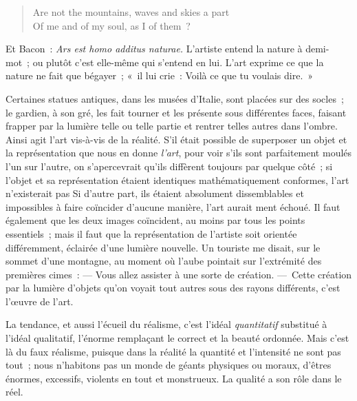 \documentclass[french,twoside]{book} %
\begin{document}
\begin{verse}
Are not the mountains, waves and skies a part\\
Of me and of my soul, as I of them ?\\
\end{verse}

\noindent Et Bacon : \emph{Ars est homo additus naturae.} L’artiste entend la nature à demi-mot ; ou plutôt c’est elle-même qui s’entend en lui. L’art exprime ce que la nature ne fait que bégayer ; « il lui crie : Voilà ce que tu voulais dire. »\par
Certaines statues antiques, dans les musées d’Italie, sont placées sur des socles ; le gardien, à son gré, les fait tourner et les présente sous différentes faces, faisant frapper par la lumière telle ou telle partie et rentrer telles autres dans l’ombre. Ainsi agit l’art vis-à-vis de la réalité. S’il était possible de superposer un objet et la représentation que nous en donne \emph{l’art}, pour voir s’ils sont parfaitement moulés l’un sur l’autre, on s’apercevrait qu’ils diffèrent toujours par quelque côté ; si l’objet et sa représentation étaient identiques mathématiquement conformes, l’art n’existerait pas Si d’autre part, ils étaient absolument dissemblables et impossibles à faire coïncider d’aucune manière, l’art aurait ment échoué. Il faut également que les deux images coïncident, au moins par tous les points essentiels ; mais il faut que la représentation de l’artiste soit orientée différemment, éclairée d’une lumière nouvelle. Un touriste me disait, sur le sommet d’une montagne, au moment où l’aube pointait sur l’extrémité des premières cimes : — Vous allez assister à une sorte de création. — Cette création par la lumière d’objets qu’on voyait tout autres sous des rayons différents, c’est l’œuvre de l’art.\par
La tendance, et aussi l’écueil du réalisme, c’est l’idéal \emph{quantitatif} substitué à l’idéal qualitatif, l’énorme remplaçant le correct et la beauté ordonnée. Mais c’est là du faux réalisme, puisque dans la réalité la quantité et l’intensité ne sont pas tout ; nous n’habitons pas un monde de géants physiques ou moraux, d’êtres énormes, excessifs, violents en tout et monstrueux. La qualité a son rôle dans le réel.\par
\end{document}
